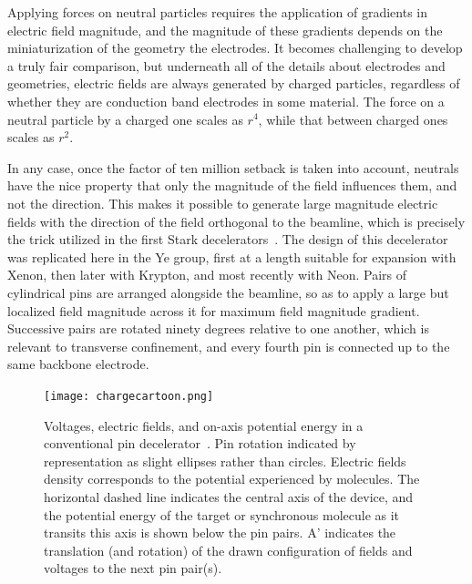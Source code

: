 Applying forces on neutral particles requires the application of gradients in electric field magnitude, and the magnitude of these gradients depends on the miniaturization of the geometry the electrodes.
It becomes challenging to develop a truly fair comparison, but underneath all of the details about electrodes and geometries, electric fields are always generated by charged particles, regardless of whether they are conduction band electrodes in some material.
The force on a neutral particle by a charged one scales as $r^4$, while that between charged ones scales as $r^2$.

In any case, once the factor of ten million setback is taken into account, neutrals have the nice property that only the magnitude of the field influences them, and not the direction. 
This makes it possible to generate large magnitude electric fields with the direction of the field orthogonal to the beamline, which is precisely the trick utilized in the first Stark decelerators~\cite{Bethlem1999}.
The design of this decelerator was replicated here in the Ye group, first at a length suitable for expansion with Xenon, then later with Krypton, and most recently with Neon.
Pairs of cylindrical pins are arranged alongside the beamline, so as to apply a large but localized field magnitude across it for maximum field magnitude gradient.
Successive pairs are rotated ninety degrees relative to one another, which is relevant to transverse confinement, and every fourth pin is connected up to the same backbone electrode.

\begin{figure}[t!]
\centering
\texttt{[image: chargecartoon.png]}%
\caption[Voltages, E-fields, and on-axis Energy]{\label{fig:decelcartoon}
Voltages, electric fields, and on-axis potential energy in a conventional pin decelerator~\cite{Bethlem1999}. Pin rotation indicated by representation as slight ellipses rather than circles. Electric fields density corresponds to the potential experienced by molecules. The horizontal dashed line indicates the central axis of the device, and the potential energy of the target or synchronous molecule as it transits this axis is shown below the pin pairs. A' indicates the translation (and rotation) of the drawn configuration of fields and voltages to the next pin pair(s). 
}
\end{figure}

